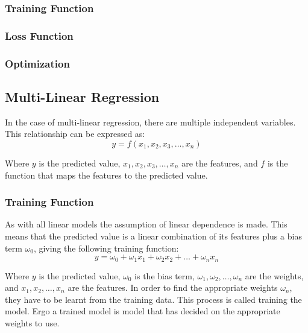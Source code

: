 \documentclass[12pt letter]{report}
\begin{document}
\subsubsection{Training Function}

\subsubsection{Loss Function}

\subsubsection{Optimization}

\subsection{Multi-Linear Regression}
In the case of multi-linear regression, there are multiple independent variables. This relationship can be expressed as:
\[
  y = f \left( x_1, x_2, x_3, \ldots, x_n \right)
\]

Where $y$ is the predicted value, $x_1, x_2, x_3, \ldots, x_n$ are the features, and $f$ is the function that maps the features to the predicted value.

\subsubsection{Training Function}

As with all linear models the assumption of linear dependence is made. This means that the predicted value is a linear
combination of its features plus a bias term $\omega_0$, giving the following training function:
\[
  y = \omega_0 + \omega_1 x_1 + \omega_2 x_2 + \ldots + \omega_n x_n
\]

Where $y$ is the predicted value, $\omega_0$ is the bias term, $\omega_1, \omega_2, \ldots, \omega_n$ are the weights,
and $x_1, x_2, \ldots, x_n$ are the features. In order to find the appropriate weights $\omega_n$, they have to be
learnt from the training data.  This process is called training the model. Ergo a trained model is model that has
decided on the appropriate weights to use.
\end{document}
